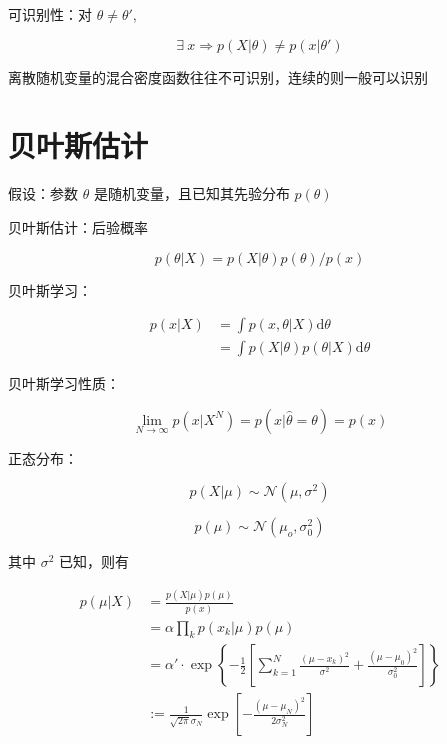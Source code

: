 \documentclass[openany,a4paper,12pt]{ctexbook}
\theoremstyle{kaiti}
\theoremstyle{normal}
\begin{document}
可识别性：对 $\theta \ne \theta '$, 

\begin{equation}
\exists~x\Rightarrow p(X|\theta)\ne p\left(x|\theta ' \right)
\end{equation}

离散随机变量的混合密度函数往往不可识别，连续的则一般可以识别

\section{贝叶斯估计}

假设：参数 $\theta$ 是随机变量，且已知其先验分布 $p(\theta)$

贝叶斯估计：后验概率

\begin{equation}
p\left(\theta |X \right)=p(X|\theta)p(\theta)/p(x)
\end{equation}

贝叶斯学习：

\begin{equation}
\begin{aligned}
  p\left(x|X \right)
  &=\int{p\left(x,\theta |X \right)\mathrm{d}\theta}\\
  &=\int{p(X|\theta)p\left(\theta |X \right)\mathrm{d}\theta}
\end{aligned}
\end{equation}

贝叶斯学习性质：

\begin{equation}
\lim_{N\rightarrow \infty} p\left(x|X^N \right)=p\left(x|\hat{\theta}=\theta \right)=p(x)
\end{equation}

正态分布：

\begin{equation}
p(X|\mu)\sim \mathcal{N} \left(\mu ,\sigma^2 \right)
\end{equation}

\begin{equation}
p(\mu)\sim \mathcal{N} \left(\mu_o,\sigma_{0}^{2} \right)
\end{equation}

其中 $\sigma^2$ 已知，则有

\begin{equation}
\begin{aligned}
  p(\mu|X)
  &=\frac{p(X|\mu)p(\mu)}{p(x)}\\
  &=\alpha \prod_kp\left(x_k|\mu \right)p(\mu)\\
  &=\alpha '\cdot \exp \left\{ -\frac{1}{2}\left[\sum_{k=1}^N{\frac{\left(\mu -x_k \right)^2}{\sigma^2}}+\frac{\left(\mu -\mu_0 \right)^2}{\sigma_{0}^{2}} \right] \right\} \\
  &:=\frac{1}{\sqrt{2\pi}\sigma_N}\exp \left[-\frac{\left(\mu -\mu_N \right)^2}{2\sigma_{N}^{2}} \right]
\end{aligned}
\end{equation}
\end{document}
